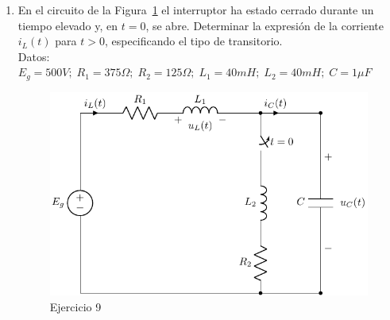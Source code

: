 \begin{enumerate}

\item En el circuito de la Figura~\ref{fig.ej12_BT4} el interruptor ha estado cerrado durante un tiempo elevado y, en $t = 0$, se abre. Determinar la expresión de la corriente $i_L(t)$ para $t>0$, especificando el tipo de transitorio.\\
Datos: $E_g = 500 V;\; R_1 = 375 \Omega;\; R_2 = 125\Omega;\; L_1 = 40 mH;\; L_2 = 40 mH;\; C = 1 \mu F$
\begin{figure}[H]
    \centering
    \includegraphics{../figs/ej12_BT4.pdf}
    \caption{Ejercicio 9}
    \label{fig.ej12_BT4}
\end{figure}


\end{enumerate}
